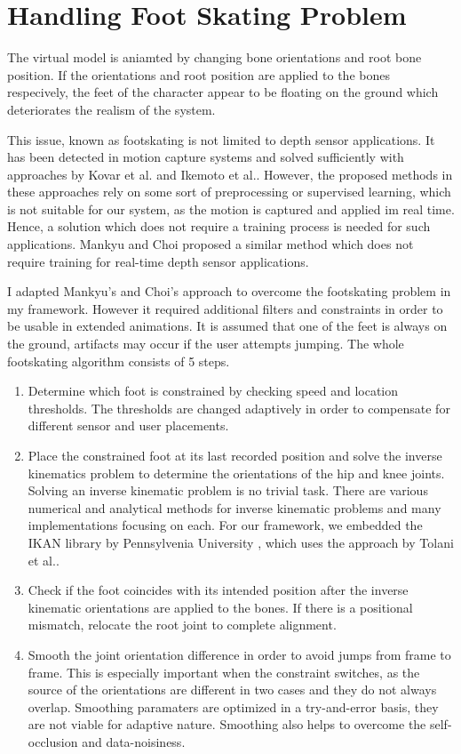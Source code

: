 \section{Handling Foot Skating Problem}
\label{section_foot_skating}
The virtual model is aniamted by changing bone orientations and root bone position. If the orientations and root position are applied to 
the bones respecively, the feet of the character appear to be floating on the ground which deteriorates the realism of the system. 

This issue, known as footskating is not limited to depth sensor applications. It has been detected in motion capture systems and solved sufficiently with approaches by 
Kovar et al.\cite{Kovar2002} and Ikemoto et al.\cite{Ikemoto2006}. However, the proposed methods in these approaches rely on some sort of preprocessing or supervised learning,
which is not suitable for our system, as the motion is captured and applied im real time. Hence, a solution which does not require a training process is needed for such applications. 
Mankyu and Choi \cite{Mankyu2013} proposed a similar method which does not require training for real-time depth sensor applications. 

I adapted Mankyu's and Choi's approach to overcome the footskating problem in my framework. However it required additional filters and constraints in order to be usable in extended 
animations. It is assumed that one of the feet is always on the ground, artifacts may occur if the user attempts jumping. The whole footskating algorithm consists of 5 steps. 

\begin{enumerate}
\item Determine which foot is constrained by checking speed and location thresholds. The thresholds are changed adaptively in order to compensate for different sensor and user placements.
\item Place the constrained foot at its last recorded position and solve the inverse kinematics problem to determine the orientations of the hip and knee joints. Solving an inverse kinematic
problem is no trivial task. There are various numerical and analytical methods for inverse kinematic problems and many implementations focusing on each. For our framework, we embedded 
the IKAN library by Pennsylvenia University \cite{IKAN2013}, which uses the approach by Tolani et al.\cite{Tolani2000}.  
\item Check if the foot coincides with its intended position after the inverse kinematic orientations are applied to the bones. If there is a positional mismatch, relocate the root joint to complete alignment.
\item Smooth the joint orientation difference in order to avoid jumps from frame to frame. This is especially important when the constraint switches, as the source of the orientations are different in two cases and they do not always overlap.
Smoothing paramaters are optimized in a try-and-error basis, they are not viable for adaptive nature. Smoothing also helps to overcome the self-occlusion and data-noisiness.
\end{enumerate}

